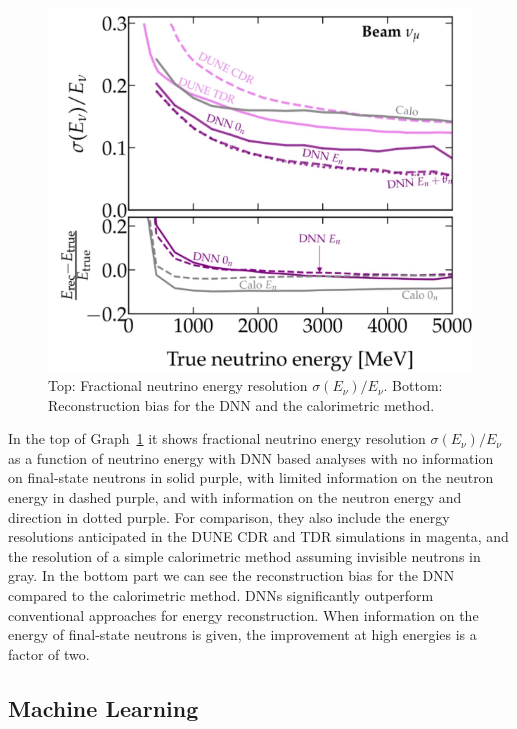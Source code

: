 \begin{figure}[H]
	\centering
	\includegraphics[width=\textwidth,height=0.4\textheight]{assets/DNNmachinelearning.png}
	\caption{Top: Fractional neutrino energy resolution $\sigma (E_{\nu})/E_{\nu}$. Bottom: Reconstruction bias for the DNN and the calorimetric method. 
	}
	\label{graph:DNN}
\end{figure}

In the top of Graph~\ref{graph:DNN} it shows fractional neutrino energy resolution $\sigma (E_{\nu})/E_{\nu}$ as a function of neutrino energy with DNN based analyses with no information on final-state neutrons in solid purple, with limited information on the neutron energy in dashed purple, and with information on the neutron energy and direction in dotted purple. For comparison, they also include the energy resolutions anticipated in the DUNE CDR and TDR simulations in magenta, and the resolution of a simple calorimetric method assuming invisible neutrons in gray. In the bottom part we can see the reconstruction bias for the DNN compared to the calorimetric method. DNNs significantly outperform conventional approaches for energy reconstruction. When information on the energy of final-state neutrons is given, the improvement at high energies is  a factor of two.

\subsection{Machine Learning}

